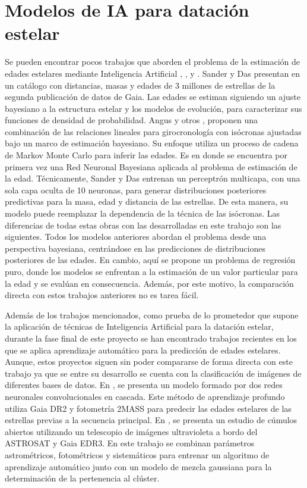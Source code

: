 \section{Modelos de IA para datación estelar}
Se pueden encontrar pocos trabajos que aborden el problema de la estimación de edades estelares mediante Inteligencia Artificial \cite{stardate}, \cite{Angus19}, \cite{das2018} y \cite{sanders2018}. Sander y Das presentan en \cite{sanders2018} un catálogo con distancias, masas y edades de 3 millones de estrellas de la segunda publicación de datos de Gaia. Las edades se estiman siguiendo un ajuste bayesiano a la estructura estelar y los modelos de evolución, para caracterizar sus funciones de densidad de probabilidad. Angus y otros \cite{stardate}, \cite{Angus19} proponen una combinación de las relaciones lineales para girocronología con isócronas ajustadas bajo un marco de estimación bayesiano. Su enfoque utiliza un proceso de cadena de Markov Monte Carlo para inferir las edades. Es en \cite{sanders2018} donde se encuentra por primera vez una Red Neuronal Bayesiana aplicada al problema de estimación de la edad. Técnicamente, Sander y Das entrenan un perceptrón multicapa, con una sola capa oculta de 10 neuronas, para generar distribuciones posteriores predictivas para la masa, edad y distancia de las estrellas. De esta manera, su modelo puede reemplazar la dependencia de la técnica de las isócronas. Las diferencias de todas estas obras con las desarrolladas en este trabajo son las siguientes. Todos los modelos anteriores abordan el problema desde una perspectiva bayesiana, centrándose en las predicciones de distribuciones posteriores de las edades. En cambio, aquí se propone un problema de regresión puro, donde los modelos se enfrentan a la estimación de un valor particular para la edad y se evalúan en consecuencia. Además, por este motivo, la comparación directa con estos trabajos anteriores no es tarea fácil.

Además de los trabajos mencionados, como prueba de lo prometedor que supone la aplicación de técnicas de Inteligencia Artificial para la datación estelar, durante la fase final de este proyecto se han encontrado trabajos recientes en los que se aplica aprendizaje automático para la predicción de edades estelares. Aunque, estos proyectos siguen sin poder compararse de forma directa con este trabajo ya que se entre su desarrollo se cuenta con la clasificación de imágenes de diferentes bases de datos. En \cite{2020AAS...23633104M}, se presenta un modelo formado por dos redes neuronales convolucionales en cascada. Este método de aprendizaje profundo utiliza Gaia DR2 y fotometría 2MASS para predecir las edades estelares de las estrellas previas a la secuencia principal. En \cite{Jadhav_2021}, se presenta un estudio de cúmulos abiertos utilizando un telescopio de imágenes ultravioleta a bordo del ASTROSAT y Gaia EDR3. En este trabajo se combinan parámetros astrométricos, fotométricos y sistemáticos para entrenar un algoritmo de aprendizaje automático junto con un modelo de mezcla gaussiana para la determinación de la pertenencia al clúster.


